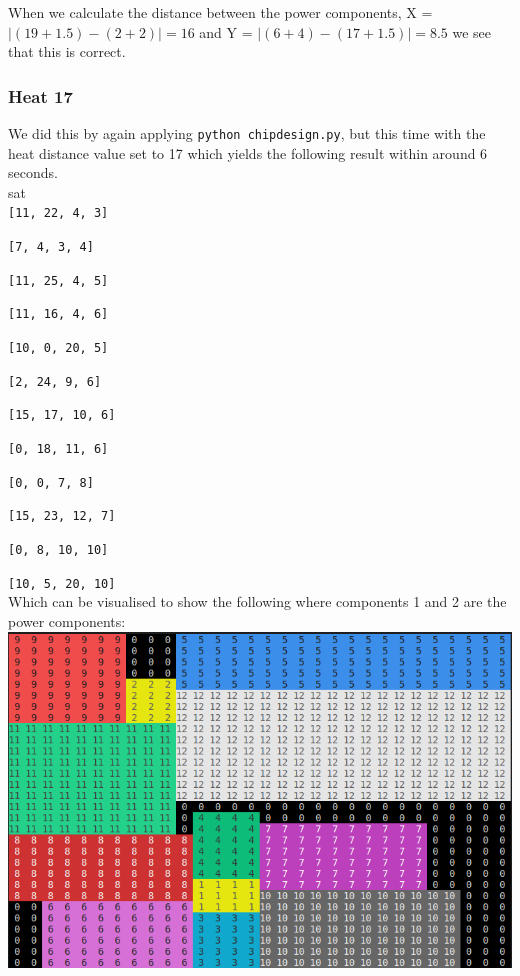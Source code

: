 \documentclass[12pt]{article}
\begin{document}
When we calculate the distance between the power components, X = $ |(19 + 1.5) - (2 + 2)| = 16 $ and Y = $  |(6 + 4) - (17+1.5)| = 8.5 $ we see that this is correct.

\subsubsection*{Heat 17}

We did this by again applying {\tt python chipdesign.py}, but this time with the heat distance value set to 17 which yields the following result within around 6 seconds.\\
sat\\

{\tt [11, 22, 4, 3]}

{\tt [7, 4, 3, 4]}

{\tt [11, 25, 4, 5]}

{\tt [11, 16, 4, 6]}

{\tt [10, 0, 20, 5]}

{\tt [2, 24, 9, 6]}

{\tt [15, 17, 10, 6]}

{\tt [0, 18, 11, 6]}

{\tt [0, 0, 7, 8]}

{\tt [15, 23, 12, 7]}

{\tt [0, 8, 10, 10]}

{\tt [10, 5, 20, 10]}\\

 Which can be visualised to show the following where components 1 and 2 are the power components:\\

\includegraphics[width=\linewidth]{images/chipdesign_heat_17.png}
\end{document}
